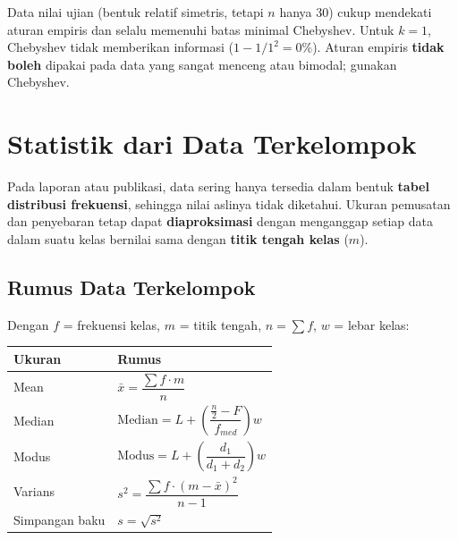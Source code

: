 \documentclass[
  indonesian,
  letterpaper,
]{book}
\newcounter{none} %
\begin{document}
Data nilai ujian (bentuk relatif simetris, tetapi \(n\) hanya 30) cukup
mendekati aturan empiris dan selalu memenuhi batas minimal Chebyshev.
Untuk \(k = 1\), Chebyshev tidak memberikan informasi
(\(1 - 1/1^2 = 0\%\)). Aturan empiris \textbf{tidak boleh} dipakai pada
data yang sangat menceng atau bimodal; gunakan Chebyshev.

\section{Statistik dari Data
Terkelompok}\label{statistik-dari-data-terkelompok}

Pada laporan atau publikasi, data sering hanya tersedia dalam bentuk
\textbf{tabel distribusi frekuensi}, sehingga nilai aslinya tidak
diketahui. Ukuran pemusatan dan penyebaran tetap dapat
\textbf{diaproksimasi} dengan menganggap setiap data dalam suatu kelas
bernilai sama dengan \textbf{titik tengah kelas} (\(m\)).

\subsection{Rumus Data Terkelompok}\label{rumus-data-terkelompok}

Dengan \(f\) = frekuensi kelas, \(m\) = titik tengah, \(n = \sum f\),
\(w\) = lebar kelas:

{\def\LTcaptype{none} %
\begin{longtable}[]{@{}
  >{\raggedright\arraybackslash}p{}
  >{\raggedright\arraybackslash}p{}@{}}
\toprule\noalign{}
\begin{minipage}[b]{\linewidth}\raggedright
Ukuran
\end{minipage} & \begin{minipage}[b]{\linewidth}\raggedright
Rumus
\end{minipage} \\
\midrule\noalign{}
\endhead
\bottomrule\noalign{}
\endlastfoot
Mean & \(\bar{x} = \dfrac{\sum f \cdot m}{n}\) \\
Median &
\(\text{Median} = L + \left(\dfrac{\frac{n}{2} - F}{f_{med}}\right) w\) \\
Modus & \(\text{Modus} = L + \left(\dfrac{d_1}{d_1 + d_2}\right) w\) \\
Varians & \(s^2 = \dfrac{\sum f \cdot (m - \bar{x})^2}{n-1}\) \\
Simpangan baku & \(s = \sqrt{s^2}\) \\
\end{longtable}
}
\end{document}
